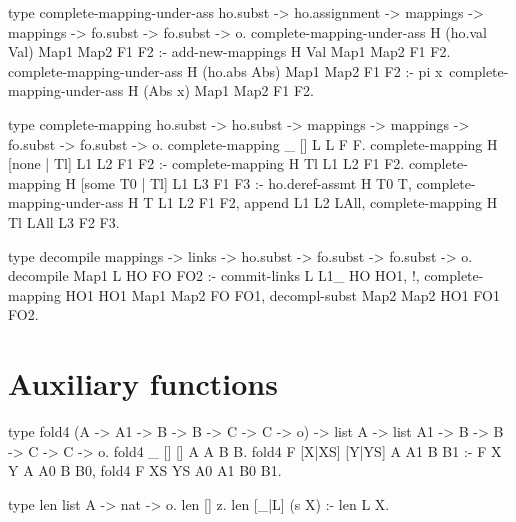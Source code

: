 \begin{elpicode}
  type complete-mapping-under-ass ho.subst -> ho.assignment -> 
    mappings -> mappings ->  fo.subst -> fo.subst -> o.
  complete-mapping-under-ass H (ho.val Val) Map1 Map2 F1 F2 :- 
    add-new-mappings H Val Map1 Map2 F1 F2.
  complete-mapping-under-ass H (ho.abs Abs) Map1 Map2 F1 F2 :- 
    pi x\ complete-mapping-under-ass H (Abs x) Map1 Map2 F1 F2.

  type complete-mapping ho.subst -> ho.subst ->   
    mappings -> mappings -> fo.subst -> fo.subst -> o.
  complete-mapping _ [] L L F F.
  complete-mapping H [none | Tl] L1 L2 F1 F2 :-   
    complete-mapping H Tl L1 L2 F1 F2.
  complete-mapping H [some T0 | Tl] L1 L3 F1 F3 :-
    ho.deref-assmt H T0 T,
    complete-mapping-under-ass H T L1 L2 F1 F2, 
    append L1 L2 LAll,
    complete-mapping H Tl LAll L3 F2 F3.

  type decompile mappings -> links -> ho.subst -> 
    fo.subst -> fo.subst -> o.
  decompile Map1 L HO FO FO2 :- 
    commit-links L L1_ HO HO1, !,
    complete-mapping HO1 HO1 Map1 Map2 FO FO1,
    decompl-subst Map2 Map2 HO1 FO1 FO2.
\end{elpicode}

\section{Auxiliary functions}

\begin{elpicode}
  type fold4 (A -> A1 -> B -> B -> C -> C -> o) -> list A -> 
    list A1 -> B -> B -> C -> C -> o.
  fold4 _ [] [] A A B B.
  fold4 F [X|XS] [Y|YS] A A1 B B1 :- F X Y A A0 B B0, 
    fold4 F XS YS A0 A1 B0 B1.
  
  type len list A -> nat -> o.
  len [] z.
  len [_|L] (s X) :- len L X.
  
  \end{elpicode}
  